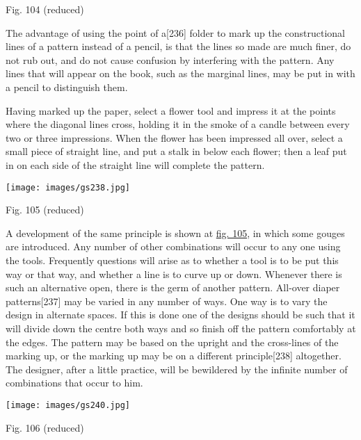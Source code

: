 \documentclass[
]{article}
\begin{document}
Fig. 104 (reduced)

The advantage of using the point of
a{\protect\hypertarget{Page_236}{}{{[}236{]}}} folder to mark up the
constructional lines of a pattern instead of a pencil, is that the lines
so made are much finer, do not rub out, and do not cause confusion by
interfering with the pattern. Any lines that will appear on the book,
such as the marginal lines, may be put in with a pencil to distinguish
them.

Having marked up the paper, select a flower tool and impress it at the
points where the diagonal lines cross, holding it in the smoke of a
candle between every two or three impressions. When the flower has been
impressed all over, select a small piece of straight line, and put a
stalk in below each flower; then a leaf put in on each side of the
straight line will complete the pattern.

\protect\hypertarget{Fig_105}{}{}
\texttt{[image: images/gs238.jpg]}

Fig. 105 (reduced)

A development of the same principle is shown at
\protect\hyperlink{Fig_105}{fig. 105}, in which some gouges are
introduced. Any number of other combinations will occur to any one using
the tools. Frequently questions will arise as to whether a tool is to be
put this way or that way, and whether a line is to curve up or down.
Whenever there is such an alternative open, there is the germ of another
pattern. All-over diaper
patterns{\protect\hypertarget{Page_237}{}{{[}237{]}}} may be varied in
any number of ways. One way is to vary the design in alternate spaces.
If this is done one of the designs should be such that it will divide
down the centre both ways and so finish off the pattern comfortably at
the edges. The pattern may be based on the upright and the cross-lines
of the marking up, or the marking up may be on a different
principle{\protect\hypertarget{Page_238}{}{{[}238{]}}} altogether. The
designer, after a little practice, will be bewildered by the infinite
number of combinations that occur to him.

\protect\hypertarget{Fig_106}{}{}
\texttt{[image: images/gs240.jpg]}

Fig. 106 (reduced)
\end{document}
